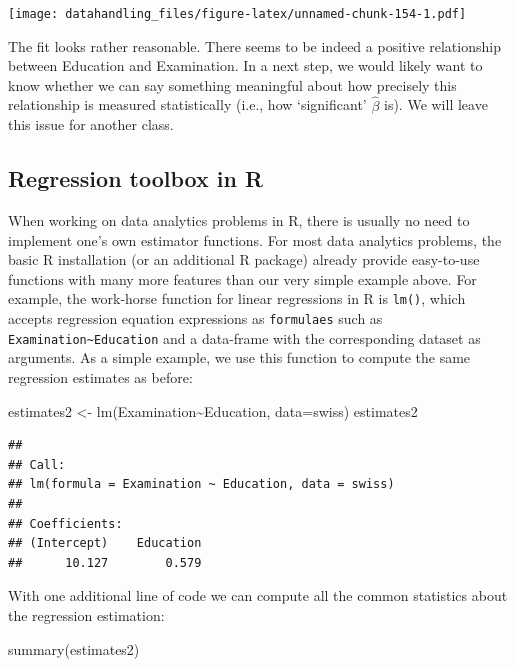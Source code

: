 \documentclass[
  12pt,
]{style/krantz}
\newenvironment{Shaded}{\begin{snugshade}}{\end{snugshade}}
\newcommand{\AttributeTok}[1]{\textcolor[rgb]{0.77,0.63,0.00}{#1}}
\newcommand{\FunctionTok}[1]{\textcolor[rgb]{0.00,0.00,0.00}{#1}}
\newcommand{\NormalTok}[1]{#1}
\newcommand{\OtherTok}[1]{\textcolor[rgb]{0.56,0.35,0.01}{#1}}
\newcommand{\SpecialCharTok}[1]{\textcolor[rgb]{0.00,0.00,0.00}{#1}}
\begin{document}
\texttt{[image: datahandling\_files/figure-latex/unnamed-chunk-154-1.pdf]}

The fit looks rather reasonable. There seems to be indeed a positive relationship between Education and Examination. In a next step, we would likely want to know whether we can say something meaningful about how precisely this relationship is measured statistically (i.e., how `significant' \(\hat{\beta}\) is). We will leave this issue for another class.

\hypertarget{regression-toolbox-in-r}{%
\subsection{Regression toolbox in R}\label{regression-toolbox-in-r}}

When working on data analytics problems in R, there is usually no need to implement one's own estimator functions. For most data analytics problems, the basic R installation (or an additional R package) already provide easy-to-use functions with many more features than our very simple example above. For example, the work-horse function for linear regressions in R is \texttt{lm()}, which accepts regression equation expressions as \texttt{formulaes} such as \texttt{Examination\textasciitilde{}Education} and a data-frame with the corresponding dataset as arguments. As a simple example, we use this function to compute the same regression estimates as before:

\begin{Shaded}
\begin{Highlighting}[]
\NormalTok{estimates2 }\OtherTok{\textless{}{-}} \FunctionTok{lm}\NormalTok{(Examination}\SpecialCharTok{\textasciitilde{}}\NormalTok{Education, }\AttributeTok{data=}\NormalTok{swiss)}
\NormalTok{estimates2}
\end{Highlighting}
\end{Shaded}

\begin{verbatim}
## 
## Call:
## lm(formula = Examination ~ Education, data = swiss)
## 
## Coefficients:
## (Intercept)    Education  
##      10.127        0.579
\end{verbatim}

With one additional line of code we can compute all the common statistics about the regression estimation:

\begin{Shaded}
\begin{Highlighting}[]
\FunctionTok{summary}\NormalTok{(estimates2)}
\end{Highlighting}
\end{Shaded}
\end{document}
